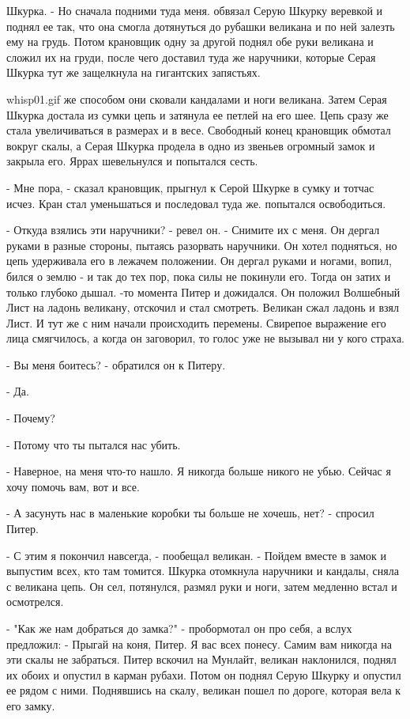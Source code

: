 Шкурка. - Но сначала подними туда меня.
 обвязал Серую Шкурку веревкой и поднял ее так, что она 
смогла дотянуться до рубашки великана и по ней залезть ему на грудь. 
Потом крановщик одну за другой поднял обе руки великана и сложил их на 
груди, после чего доставил туда же наручники, которые Серая Шкурка тут 
же защелкнула на гигантских запястьях.
\par{whisp01.gif}
 же способом они сковали кандалами и ноги великана. Затем Серая 
Шкурка достала из сумки цепь и затянула ее петлей на его шее. Цепь 
сразу же стала увеличиваться в размерах и в весе. Свободный конец 
крановщик обмотал вокруг скалы, а Серая Шкурка продела в одно из 
звеньев огромный замок и закрыла его.
 Яррах шевельнулся и попытался сесть.
\par- Мне пора, - сказал крановщик, прыгнул к Серой Шкурке в сумку и 
тотчас исчез. Кран стал уменьшаться и последовал туда же.
 попытался освободиться.
\par- Откуда взялись эти наручники? - ревел он. - Снимите их с меня.
Он дергал руками в разные стороны, пытаясь разорвать наручники. Он 
хотел подняться, но цепь удерживала его в лежачем положении. Он дергал 
руками и ногами, вопил, бился о землю - и так до тех пор, пока силы не 
покинули его. Тогда он затих и только глубоко дышал.
-то момента Питер и дожидался. Он положил Волшебный Лист на 
ладонь великану, отскочил и стал смотреть. Великан сжал ладонь и взял 
Лист. И тут же с ним начали происходить перемены. Свирепое выражение 
его лица смягчилось, а когда он заговорил, то голос уже не вызывал ни 
у кого страха.
\par- Вы меня боитесь? - обратился он к Питеру.
\par- Да.
\par- Почему?
\par- Потому что ты пытался нас убить.
\par- Наверное, на меня что-то нашло. Я никогда больше никого не убью. 
Сейчас я хочу помочь вам, вот и все.
\par- А засунуть нас в маленькие коробки ты больше не хочешь, нет? - 
спросил Питер.
\par- С этим я покончил навсегда, - пообещал великан. - Пойдем вместе 
в замок и выпустим всех, кто там томится.
 Шкурка отомкнула наручники и кандалы, сняла с великана цепь. 
Он сел, потянулся, размял руки и ноги, затем медленно встал и 
осмотрелся.
\par- "Как же нам добраться до замка?" - пробормотал он про себя, а 
вслух предложил: - Прыгай на коня, Питер. Я вас всех понесу. Самим вам 
никогда на эти скалы не забраться.
 Питер вскочил на Мунлайт, великан наклонился, поднял их 
обоих и опустил в карман рубахи. Потом он поднял Серую Шкурку и 
опустил ее рядом с ними. Поднявшись на скалу, великан пошел по дороге, 
которая вела к его замку.
